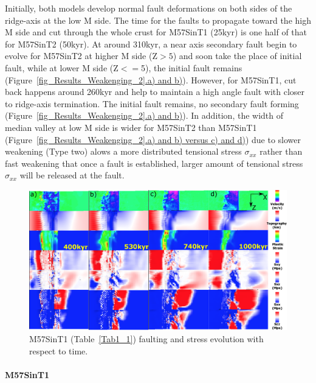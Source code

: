 Initially, both models develop normal fault deformations on both sides of the ridge-axis at the low M side. The time for the faults to propagate toward the high M side and cut through the whole crust for M57SinT1 (25kyr) is one half of that for M57SinT2 (50kyr). At around 310kyr, a near axis secondary fault begin to evolve for M57SinT2 at higher M side (Z$>5$) and soon take the place of initial fault, while at lower M side (Z$<=$5), the initial fault remains (Figure~\hyperref[fig_Results_Weakenging_2]{\ref{fig_Results_Weakenging_2}.a) and b)}). However, for M57SinT1, cut back happens around 260kyr and help to maintain a high angle fault with closer to ridge-axis termination. The initial fault remains, no secondary fault forming (Figure~\hyperref[fig_Results_Weakenging_2]{\ref{fig_Results_Weakenging_2}.a) and b)}). In addition, the width of median valley at low M side is wider for M57SinT2 than M57SinT1 (Figure~\hyperref[fig_Results_Weakenging_2]{\ref{fig_Results_Weakenging_2}.a) and b) versus c) and d)}) due to slower weakening (Type two) alows a more distributed tensional stress $\sigma_{xx}$ rather than fast weakening that once a fault is established, larger amount of tensional stress $\sigma_{xx}$ will be released at the fault.  

\begin{figure}[h]
 \centering
  \includegraphics[width=1.0\textwidth]{fig_Results_Weakening_3_M57SinT1_time_evolution.eps}
 \caption{M57SinT1 (Table~\hyperref[Tab1_1]{\ref{Tab1_1}}) faulting and stress evolution with respect to time.}
\label{fig_Results_Weakenging_3}
\end{figure}

\paragraph{M57SinT1}\label{para_M57SinT1}

